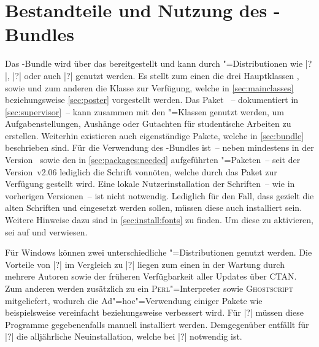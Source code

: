 \section{Bestandteile und Nutzung des \TUDScript-Bundles}
%
%
Das \TUDScript-Bundle wird über das \CTAN bereitgestellt und kann durch 
"=Distributionen wie |?|, 
|?| oder auch |?| 
genutzt werden. Es stellt zum einen die drei Hauptklassen , 
 sowie  und zum anderen die Klasse 
 zur Verfügung, welche in \autoref{sec:mainclasses} 
beziehungsweise \autoref{sec:poster} vorgestellt werden. Das Paket 
~-- dokumentiert in \autoref{sec:supervisor}~-- kann 
zusammen mit den \TUDScript"=Klassen genutzt werden, um Aufgabenstellungen, 
Aushänge oder Gutachten für studentische Arbeiten zu erstellen. Weiterhin 
existieren auch eigenständige Pakete, welche in \autoref{sec:bundle} 
beschrieben sind. Für die Verwendung des \TUDScript-Bundles ist~-- neben 
\KOMAScript{} mindestens in der Version~\vKOMAScript{} sowie den in 
\autoref{sec:packages:needed} aufgeführten "=Paketen~-- seit der 
Version~v2.06 lediglich die Schrift \OpenSans vonnöten, welche durch das Paket 
 zur Verfügung gestellt wird. Eine lokale Nutzerinstallation 
der Schriften~-- wie in vorherigen Versionen~-- ist nicht notwendig. Lediglich 
für den Fall, dass gezielt die alten Schriften \Univers und \DIN eingesetzt 
werden sollen, müssen diese auch installiert sein. Weitere Hinweise dazu sind 
in \autoref{sec:install:fonts} zu finden.  Um diese zu aktivieren, sei auf 
 und  verwiesen.

Für Windows können zwei unterschiedliche "=Distributionen genutzt 
werden. Die Vorteile von |?| im Vergleich zu 
|?| liegen zum einen in der Wartung durch mehrere 
Autoren sowie der früheren Verfügbarkeit aller Updates über CTAN. Zum anderen 
werden zusätzlich zu  ein \textsc{Perl}"=Interpreter sowie 
\textsc{Ghostscript} mitgeliefert, wodurch die Ad"=hoc"=Verwendung einiger 
Pakete wie beispielsweise  vereinfacht beziehungsweise 
verbessert wird. Für |?| müssen diese Programme 
gegebenenfalls manuell installiert werden. Demgegenüber entfällt für 
|?| die alljährliche Neuinstallation, welche bei 
|?| notwendig ist.


